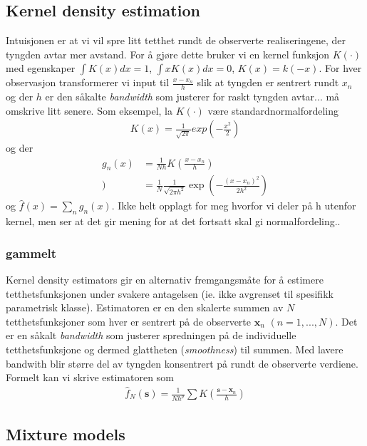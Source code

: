 \subsection{Kernel density estimation}
Intuisjonen er at vi vil spre litt tetthet rundt de observerte realiseringene, der tyngden avtar mer avstand. For å gjøre dette bruker vi en kernel funksjon $K(\cdot)$ med egenskaper $\int K(x)dx=1$, $\int x K(x)dx=0$, $K(x)=k(-x)$. For hver observasjon transformerer vi input til $\frac{x-x_n}{h}$ slik at tyngden er sentrert rundt $x_n$ og der $h$ er den såkalte \textit{bandwidth} som justerer for raskt tyngden avtar... må omskrive litt senere. Som eksempel, la $K(\cdot)$ være standardnormalfordeling
\begin{align}
K(x) = \frac{1}{\sqrt{2\pi}}exp\left(-\frac{x^2}{2}\right) 
\end{align}
og der 
\begin{align}
g_n(x) &= \frac{1}{Nh}K\left(\frac{x-x_n}{h}\right) \\
) &= \frac{1}{N}\frac{1}{\sqrt{2\pi h^2}}\exp\left(-\frac{(x-x_n)^2}{2h^2}\right) 
\end{align}
og $\hat{f}(x) = \sum_n g_n(x)$. Ikke helt opplagt for meg hvorfor vi deler på h utenfor kernel, men ser at det gir mening for at det fortsatt skal gi normalfordeling..
\subsubsection{gammelt}
Kernel density estimators gir en alternativ fremgangsmåte for å estimere tetthetsfunksjonen under svakere antagelsen (ie. ikke avgrenset til spesifikk parametrisk klasse). Estimatoren er en den skalerte summen av $N$ tetthetsfunksjoner som hver er sentrert på de observerte $\mathbf{x}_n$ $(n=1,...,N)$. Det er en såkalt \textit{bandwidth} som justerer spredningen på de individuelle tetthetsfunksjone og dermed glattheten (\textit{smoothness}) til summen. Med lavere bandwith blir større del av tyngden konsentrert på rundt de observerte verdiene. Formelt kan vi skrive estimatoren som
\begin{align}
\hat{f}_N(\mathbf{s})=\frac{1}{Nh^p}\sum K\left(\frac{\mathbf{s}-\mathbf{x}_n}{h}\right)
\end{align}
\subsection{Mixture models}